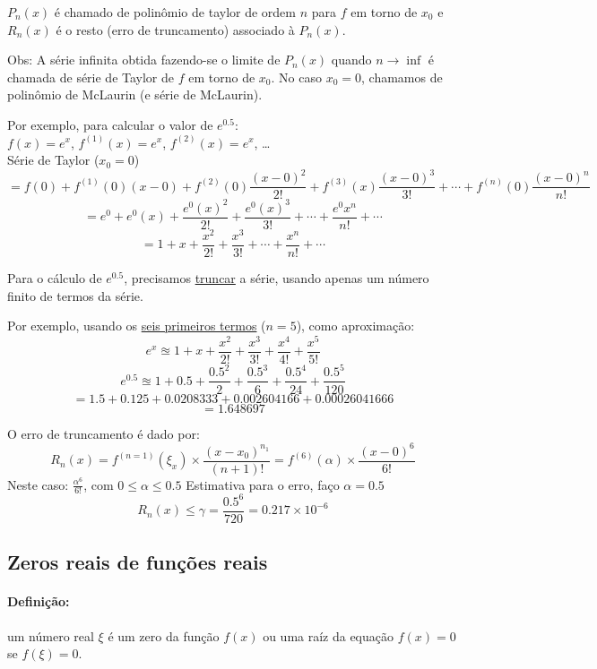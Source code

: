 \documentclass{article}
\begin{document}
            $P_n(x)$ é chamado de polinômio de taylor de ordem $n$ para $f$ em torno de $x_0$ e $R_n(x)$ é o resto (erro de truncamento) associado à $P_n(x)$.

            Obs: A série infinita obtida fazendo-se o limite de $P_n(x)$ quando $n \rightarrow \inf$ é chamada de série de Taylor de $f$ em torno de $x_0$. No caso $x_0 = 0$, chamamos de polinômio de McLaurin (e série de McLaurin).

            Por exemplo, para calcular o valor de $e^{0.5}$:\\
            $f(x) = e^x$, $f^{(1)}(x) = e^x$, $f^{(2)}(x) = e^x$, \ldots~\\

            Série de Taylor ($x_0 = 0$)
            \[= f(0) + f^{(1)}(0)(x - 0) + f^{(2)}(0)\frac{(x - 0)^2}{2!} + f^{(3)}(x)\frac{(x - 0)^3}{3!} + \cdots + f^{(n)}(0)\frac{(x-0)^n}{n!}\]
            \[= e^0 + e^0(x) + \frac{e^0(x)^2}{2!} + \frac{e^0(x)^3}{3!} + \cdots + \frac{e^0x^n}{n!} + \cdots\]
            \[= 1 + x + \frac{x^2}{2!} + \frac{x^3}{3!} + \cdots + \frac{x^n}{n!} + \cdots\]

            Para o cálculo de $e^{0.5}$, precisamos \underline{truncar} a série, usando apenas um número finito de termos da série.

            Por exemplo, usando os \underline{seis primeiros termos} ($n = 5$), como aproximação:
            \[e^x \approxeq 1 + x + \frac{x^2}{2!} + \frac{x^3}{3!} + \frac{x^4}{4!} + \frac{x^5}{5!}\]
            \[e^{0.5} \approxeq 1 + 0.5 + \frac{0.5^2}{2} + \frac{0.5^3}{6} + \frac{0.5^4}{24} + \frac{0.5^5}{120}\]
            \[= 1.5 + 0.125 + 0.0208333 + 0.002604166 + 0.00026041666\]
            \[= 1.648697\]

            O erro de truncamento é dado por:
            \[R_n(x) = f^{(n=1)}(\xi_x) \times \frac{(x - x_0)^{n_1}}{(n+1)!} = f^{(6)}(\alpha) \times \frac{(x - 0)^6}{6!}\]
            Neste caso: $\frac{\alpha^6}{6!}$, com $0 \leq \alpha \leq 0.5$
            Estimativa para o erro, faço $\alpha = 0.5$
            \[R_n(x) \leq \gamma = \frac{0.5^6}{720} = 0.217 \times 10^{-6}\]

    \subsection{Zeros reais de funções reais}
        \paragraph{Definição:} um número real $\xi$ é um zero da função $f(x)$ ou uma raíz da equação $f(x)=0$ se $f(\xi)=0$.
\end{document}
